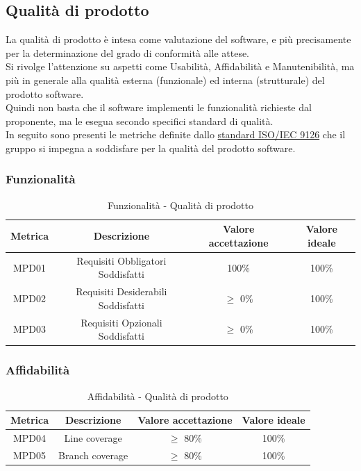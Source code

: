 \documentclass[10pt]{article}
\begin{document}
\begin{justify}
\subsection{Qualità di prodotto}
La qualità di prodotto è intesa come valutazione del software, e più precisamente per la determinazione del grado di conformità alle attese.\\
Si rivolge l'attenzione su aspetti come Usabilità, Affidabilità e Manutenibilità, ma più in generale alla qualità esterna (funzionale) ed interna (strutturale) del prodotto software.\\
Quindi non basta che il software implementi le funzionalità richieste dal proponente, ma le esegua secondo specifici standard di qualità.\\
In seguito sono presenti le metriche definite dallo \hyperref[ISO 9126]{standard ISO/IEC 9126} che il gruppo si impegna a soddisfare per la qualità del prodotto software.
\subsubsection{Funzionalità}
\begin{table}[H]
  \centering
\begin{tabular}{|c|c|c|c|}
  \hline
  \textbf{Metrica} & \textbf{Descrizione} & \textbf{Valore accettazione} & \textbf{Valore ideale}\\
  \hline
  MPD01 & Requisiti Obbligatori Soddisfatti & 100\% & 100\%\\
  \hline
  MPD02 & Requisiti Desiderabili Soddisfatti  & $\geq$ 0\% & 100\% \\
  \hline
  MPD03 & Requisiti Opzionali Soddisfatti & $\geq$ 0\% & 100\% \\
  \hline
\end{tabular}
\caption{Funzionalità - Qualità di prodotto}
\label{tab:funzionalità}
\end{table}

\subsubsection{Affidabilità}
\begin{table}[H]
  \centering
\begin{tabular}{|c|c|c|c|}
  \hline
  \textbf{Metrica} & \textbf{Descrizione} & \textbf{Valore accettazione} & \textbf{Valore ideale}\\
  \hline
  MPD04 & Line coverage & $\geq$ 80\% & 100\% \\
  \hline
  MPD05 & Branch coverage & $\geq$ 80\% & 100\% \\
  \hline
\end{tabular}
\caption{Affidabilità - Qualità di prodotto}
\label{tab:affidabilità}
\end{table}


\end{justify}
\end{document}
